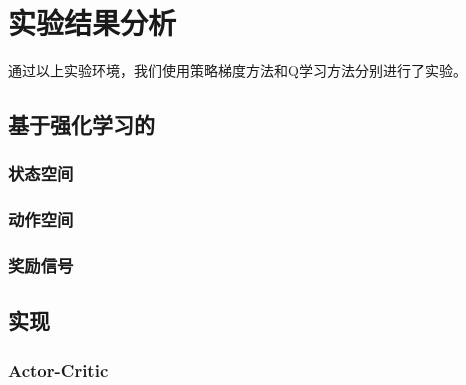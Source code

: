 \chapter{实验结果分析}
通过以上实验环境，我们使用策略梯度方法和Q学习方法分别进行了实验。

\section{基于强化学习的}

\subsection{状态空间}
\subsection{动作空间}

\subsection{奖励信号}

\section{实现}
\subsection{}
\subsection{Actor-Critic}